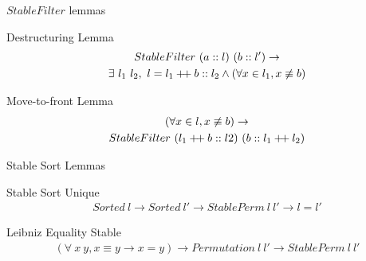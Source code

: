 \documentclass{beamer}
\newcommand\doubleplus{\ensuremath{\mathbin{+\mkern-3mu+}}}
\begin{document}
  \begin{frame}{$StableFilter$ lemmas}
    \setlength{\abovedisplayskip}{\abovedisplayshortskip}
    \setlength{\belowdisplayskip}{\belowdisplayshortskip}
    \begin{block}{Destructuring Lemma}
      \begin{gather*}
        StableFilter~(a :: l)~(b :: l') \to \\
        \exists~l_1~l_2,~l = l_1 \doubleplus b :: l_2 \land (\forall x \in l_1, x \not\equiv b)
      \end{gather*}
    \end{block}
    \begin{block}{Move-to-front Lemma}
      \begin{gather*}
        (\forall x \in l, x \not\equiv b) \to \\
        StableFilter~(l_1 \doubleplus b :: l2)~(b :: l_1 \doubleplus l_2)
      \end{gather*}
    \end{block}
  \end{frame}

  \begin{frame}{Stable Sort Lemmas}
    \setlength{\abovedisplayskip}{\abovedisplayshortskip}
    \setlength{\belowdisplayskip}{\belowdisplayshortskip}
    \begin{block}{Stable Sort Unique}
      \begin{gather*}
        Sorted~l \to Sorted~l' \to StablePerm~l~l' \to l = l'
      \end{gather*}
    \end{block}

    \begin{block}{Leibniz Equality Stable}
      \begin{gather*}
        (\forall~x~y, x \equiv y \to x = y) \to Permutation~l~l' \to StablePerm~l~l'
      \end{gather*}
    \end{block}
  \end{frame}
\end{document}
